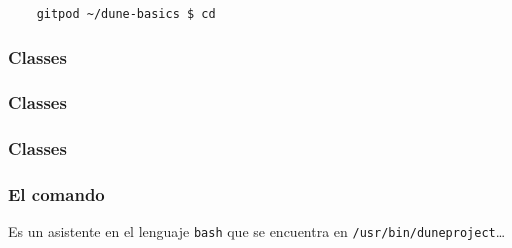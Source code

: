 \begin{frame}

\end{frame}

\begin{frame}[fragile]
	\begin{lstlisting}
    gitpod ~/dune-basics $ cd
  \end{lstlisting}
\end{frame}


\begin{frame}[fragile]
	\frametitle{Classes}

	


\end{frame}

\begin{frame}[fragile]
	\frametitle{Classes}

	

\end{frame}

\begin{frame}[fragile]
	\frametitle{Classes}

	

\end{frame}

\begin{frame}
	\frametitle{El comando }
	Es un asistente en el lenguaje \lstinline{bash} que se encuentra en \lstinline{/usr/bin/duneproject}\ldots

\end{frame}

